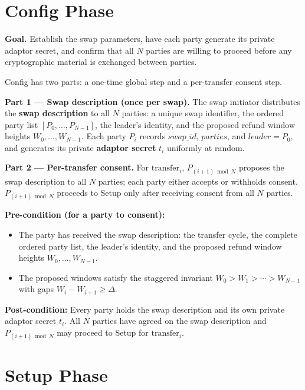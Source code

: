 \documentclass[11pt,a4paper,dvipsnames]{article}
\newcommand{\var}[1]{\mathit{#1}}
\begin{document}
\section{Config Phase}

\textbf{Goal.}\;
Establish the swap parameters, have each party generate its private adaptor
secret, and confirm that all $N$ parties are willing to proceed before any
cryptographic material is exchanged between parties.

\medskip\noindent
Config has two parts: a one-time global step and a per-transfer consent step.

\medskip\noindent\textbf{Part 1 — Swap description (once per swap).}\;
The swap initiator distributes the \textbf{swap description} to all $N$
parties: a unique swap identifier, the ordered party list
$[P_0, \ldots, P_{N-1}]$, the leader's identity, and the proposed refund
window heights $W_0, \ldots, W_{N-1}$.
Each party $P_i$ records $\var{swap\_id}$, $\var{parties}$, and
$\var{leader} = P_0$, and generates its private \textbf{adaptor secret}
$t_i$ uniformly at random.

\medskip\noindent\textbf{Part 2 — Per-transfer consent.}\;
For $\mathrm{transfer}_i$, $P_{(i+1)\bmod N}$ proposes the swap description
to all $N$ parties; each party either accepts or withholds consent.
$P_{(i+1)\bmod N}$ proceeds to Setup only after receiving consent from all
$N$ parties.

\noindent\textbf{Pre-condition (for a party to consent):}
\begin{itemize}
  \item The party has received the swap description: the transfer cycle, the
    complete ordered party list, the leader's identity, and the proposed
    refund window heights $W_0, \ldots, W_{N-1}$.
  \item The proposed windows satisfy the staggered invariant
    $W_0 > W_1 > \cdots > W_{N-1}$ with gaps $W_i - W_{i+1} \geq \Delta$.
\end{itemize}

\noindent\textbf{Post-condition:}
Every party holds the swap description and its own private adaptor secret
$t_i$.
All $N$ parties have agreed on the swap description and $P_{(i+1)\bmod N}$
may proceed to Setup for $\mathrm{transfer}_i$.

\section{Setup Phase}
\end{document}
